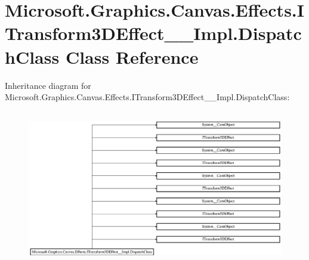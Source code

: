 \hypertarget{class_microsoft_1_1_graphics_1_1_canvas_1_1_effects_1_1_i_transform3_d_effect_____impl_1_1_dispatch_class}{}\section{Microsoft.\+Graphics.\+Canvas.\+Effects.\+I\+Transform3\+D\+Effect\+\_\+\+\_\+\+Impl.\+Dispatch\+Class Class Reference}
\label{class_microsoft_1_1_graphics_1_1_canvas_1_1_effects_1_1_i_transform3_d_effect_____impl_1_1_dispatch_class}
Inheritance diagram for Microsoft.\+Graphics.\+Canvas.\+Effects.\+I\+Transform3\+D\+Effect\+\_\+\+\_\+\+Impl.\+Dispatch\+Class\+:\begin{figure}[H]
\begin{center}
\leavevmode
\includegraphics[height=6.829268cm]{class_microsoft_1_1_graphics_1_1_canvas_1_1_effects_1_1_i_transform3_d_effect_____impl_1_1_dispatch_class}
\end{center}
\end{figure}
